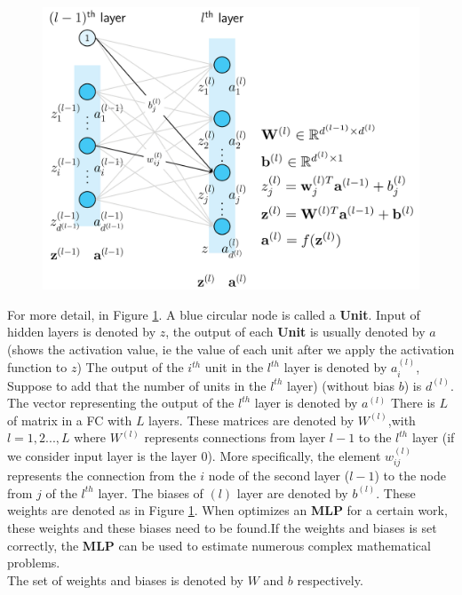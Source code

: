 \begin{center}
	\begin{figure}[H]
		\centering
		\includegraphics[width=0.75\columnwidth]{images/chap2/mlp_notation.png}
		\label{chap2:neural_net_detail}
	\end{figure}
\end{center}
\vspace{-1cm}
For more detail, in Figure \ref{chap2:neural_net_detail}. A blue circular node is called a \textbf{Unit}. Input of hidden layers is denoted by $z$, the output of each \textbf{Unit} is usually denoted by $a$
(shows the activation value, ie the value of each unit after we apply the activation function to $z$) The output of the $i^{th}$ unit in the $l^{th}$ layer is denoted by $a_{i}^{(l)}$, Suppose to add that the number of units in the $l^{th}$ layer) (without bias $b$) is $d^{(l)}$. The vector representing the output of the $l^{th}$ layer is denoted by $a^{(l)}$
There is $L$ of matrix in a FC with $L$ layers. These matrices are denoted by $W^{(l)}$,with $l = 1,2 ..., L$ where $W^{(l)}$ represents connections from layer $l-1$ to the $l^{th}$ layer (if we consider input layer is the layer $0$). More specifically, the element $w_{ij}^{(l)}$ represents the connection from the $i$ node of the second layer ($ l-1 $) to the node from $j$ of the $l^{th}$ layer. The biases of $(l)$ layer are denoted by $b^{(l)}$. These weights are denoted as in Figure \ref{chap2:neural_net_detail}. When optimizes an \textbf{MLP} for a certain work, these weights and these biases need to be found.If the weights and biases is set correctly, the \textbf{MLP} can be used to estimate numerous complex mathematical problems.\\
The set of weights and biases is denoted by $W$ and $b$ respectively.

